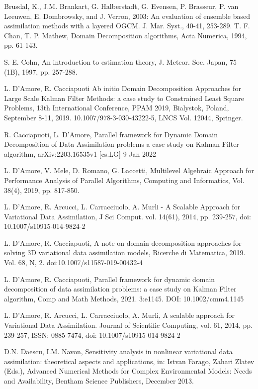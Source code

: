 \documentclass[smallcondensed]{svjour3}
\begin{document}
\begin{thebibliography}{99}
 Brusdal, K., J.M. Brankart, G. Halberstadt, G. Evensen, P. Brasseur, P. van Leeuwen, E. Dombrowsky, and J. Verron, 2003: An evaluation of ensemble based assimilation methods with a layered OGCM. J. Mar. Syst., 40-41, 253-289.
 T. F. Chan, T. P. Mathew, Domain Decomposition algorithms, Acta Numerica, 1994, pp. 61-143.


 S. E. Cohn, An introduction to estimation theory, J. Meteor. Soc. Japan, 75 (1B), 1997, pp. 257-288.


 L. D'Amore, R. Cacciapuoti  Ab initio Domain Decomposition Approaches for Large Scale Kalman Filter Methods:
a case study to Constrained Least Square Problems, 13th International Conference, PPAM 2019, Bialystok, Poland,
September 8-11, 2019. 10.1007/978-3-030-43222-5, LNCS Vol. 12044, Springer.

 R. Cacciapuoti, L. D'Amore, Parallel framework for Dynamic Domain Decomposition of Data Assimilation problems a case study on Kalman Filter algorithm, arXiv:2203.16535v1 [cs.LG] 9 Jan 2022


 L. D'Amore, V. Mele, D.  Romano, G. Laccetti, Multilevel Algebraic Approach for Performance Analysis of Parallel Algorithms, Computing and Informatics, Vol. 38(4), 2019, pp. 817-850.


 L. D'Amore, R. Arcucci, L. Carracciuolo, A. Murli - A Scalable Approach for Variational Data Assimilation, J Sci Comput. vol. 14(61), 2014, pp. 239-257, doi: 10.1007/s10915-014-9824-2


 L. D'Amore, R.  Cacciapuoti, A note on domain decomposition approaches for solving 3D variational data assimilation models, 
Ricerche di Matematica, 2019. Vol. 68, N, 2.  doi:10.1007/s11587-019-00432-4


 L. D'Amore, R.  Cacciapuoti, Parallel framework for dynamic domain decomposition of data assimilation problems: a case study on Kalman Filter algorithm, Comp and Math Methods, 2021. 3:e1145. DOI: 10.1002/cmm4.1145

 L. D'Amore, R. Arcucci, L. Carracciuolo,  A.  Murli,  A scalable approach for Variational Data Assimilation. Journal of Scientific Computing, vol. 61,  2014,  pp. 239-257, ISSN: 0885-7474, doi: 10.1007/s10915-014-9824-2

 D.N. Daescu, I.M. Navon, Sensitivity analysis in nonlinear variational data assimilation: theoretical aspects and applications, in: Istvan Farago, Zahari Zlatev (Eds.), Advanced Numerical Methods for Complex Environmental Models: Needs and Availability, Bentham Science Publishers, December 2013.




\end{thebibliography}
\end{document}

